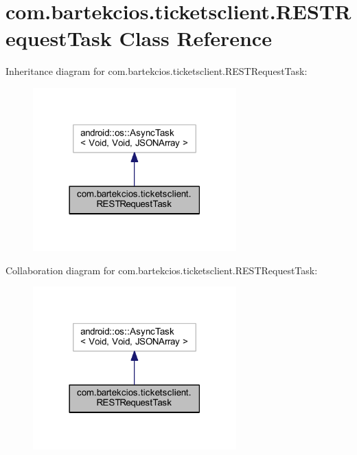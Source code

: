 \hypertarget{classcom_1_1bartekcios_1_1ticketsclient_1_1_r_e_s_t_request_task}{}\section{com.\+bartekcios.\+ticketsclient.\+R\+E\+S\+T\+Request\+Task Class Reference}
\label{classcom_1_1bartekcios_1_1ticketsclient_1_1_r_e_s_t_request_task}


Inheritance diagram for com.\+bartekcios.\+ticketsclient.\+R\+E\+S\+T\+Request\+Task\+:\nopagebreak
\begin{figure}[H]
\begin{center}
\leavevmode
\includegraphics[width=222pt]{classcom_1_1bartekcios_1_1ticketsclient_1_1_r_e_s_t_request_task__inherit__graph}
\end{center}
\end{figure}


Collaboration diagram for com.\+bartekcios.\+ticketsclient.\+R\+E\+S\+T\+Request\+Task\+:\nopagebreak
\begin{figure}[H]
\begin{center}
\leavevmode
\includegraphics[width=222pt]{classcom_1_1bartekcios_1_1ticketsclient_1_1_r_e_s_t_request_task__coll__graph}
\end{center}
\end{figure}
